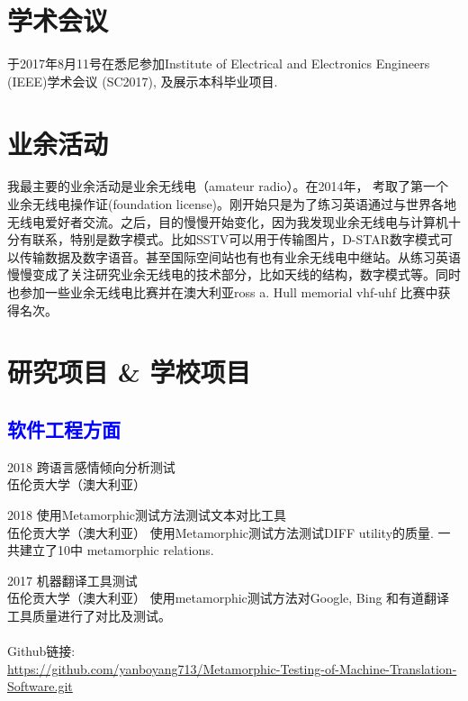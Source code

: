 \documentclass[]{friggeri-cv}
\begin{document}
\section{学术会议}
于2017年8月11号在悉尼参加Institute of Electrical and Electronics Engineers (IEEE)学术会议 (SC2017), 及展示本科毕业项目.

\section{业余活动}
我最主要的业余活动是业余无线电（amateur radio）。在2014年，
考取了第一个业余无线电操作证(foundation license)。刚开始只是为了练习英语通过与世界各地无线电爱好者交流。之后，目的慢慢开始变化，因为我发现业余无线电与计算机十分有联系，特别是数字模式。比如SSTV可以用于传输图片，D-STAR数字模式可以传输数据及数字语音。甚至国际空间站也有也有业余无线电中继站。从练习英语慢慢变成了关注研究业余无线电的技术部分，比如天线的结构，数字模式等。同时也参加一些业余无线电比赛并在澳大利亚ross a. Hull memorial vhf-uhf 比赛中获得名次。

\section{研究项目 \& 学校项目}
\subsection*{\textcolor{blue}{软件工程方面}}
\begin{entrylist}
  \entry
    {2018}
    {跨语言感情倾向分析测试\\}
    {伍伦贡大学（澳大利亚）}
    {}
\end{entrylist}

\begin{entrylist}
  \entry
    {2018}
    {使用Metamorphic测试方法测试文本对比工具\\}
    {伍伦贡大学（澳大利亚）}
    {使用Metamorphic测试方法测试DIFF utility的质量. 一共建立了10中 metamorphic relations.}
\end{entrylist}

\begin{entrylist}
  \entry
    {2017}
    {机器翻译工具测试\\}
    {伍伦贡大学（澳大利亚）}
    {使用metamorphic测试方法对Google, Bing 和有道翻译工具质量进行了对比及测试。\\\\ Github链接: \\{\small\url{https://github.com/yanboyang713/Metamorphic-Testing-of-Machine-Translation-Software.git}}}
\end{entrylist}
\end{document}

